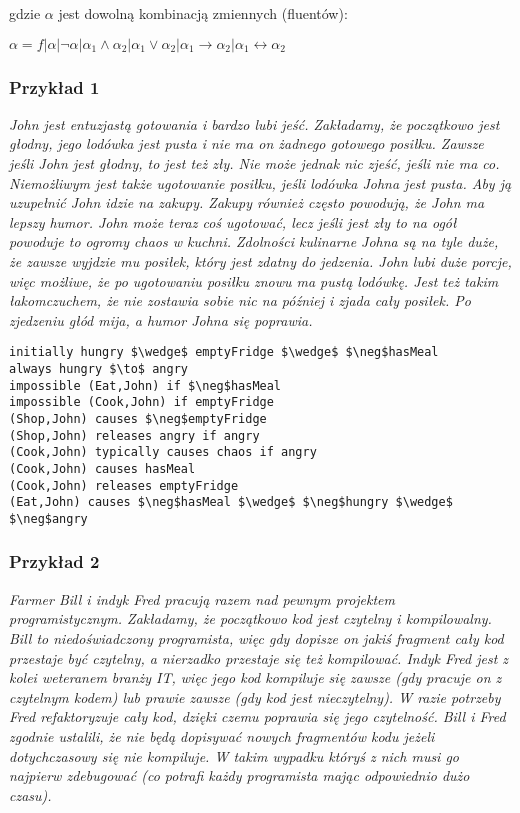 \documentclass{article}
\begin{document}
gdzie $\alpha$ jest dowolną kombinacją zmiennych (fluentów): 
\begin{center}
$\alpha= f | \alpha | \neg\alpha | \alpha_{1} \land \alpha_{2} | \alpha_{1} \lor \alpha_{2} | \alpha_{1} \to \alpha_{2} | \alpha_{1} \leftrightarrow \alpha_{2} $
\end{center}

\subsubsection{Przykład 1}


\textit{John jest entuzjastą gotowania i bardzo lubi jeść. Zakładamy, że początkowo jest głodny, jego lodówka jest pusta i nie ma on żadnego gotowego posiłku. Zawsze jeśli John jest głodny, to jest też zły. Nie może jednak nic zjeść, jeśli nie ma co. Niemożliwym jest także ugotowanie posiłku, jeśli lodówka Johna jest pusta. Aby ją uzupełnić John idzie na zakupy. Zakupy również często powodują, że John ma lepszy humor. John może teraz coś ugotować, lecz jeśli jest zły to na ogół powoduje to ogromy chaos w kuchni. Zdolności kulinarne Johna są na tyle duże, że zawsze wyjdzie mu posiłek, który jest zdatny do jedzenia. John lubi duże porcje, więc możliwe, że po ugotowaniu posiłku znowu ma pustą lodówkę. Jest też takim łakomczuchem, że nie zostawia sobie nic na później i zjada cały posiłek. Po zjedzeniu głód mija, a humor Johna się poprawia.}

\bigskip
{}
\begin{lstlisting}[mathescape=true]
initially hungry $\wedge$ emptyFridge $\wedge$ $\neg$hasMeal
always hungry $\to$ angry
impossible (Eat,John) if $\neg$hasMeal 
impossible (Cook,John) if emptyFridge
(Shop,John) causes $\neg$emptyFridge
(Shop,John) releases angry if angry
(Cook,John) typically causes chaos if angry
(Cook,John) causes hasMeal 
(Cook,John) releases emptyFridge 
(Eat,John) causes $\neg$hasMeal $\wedge$ $\neg$hungry $\wedge$ $\neg$angry
\end{lstlisting}

\subsubsection{Przykład 2}


\textit{Farmer Bill i indyk Fred pracują razem nad pewnym projektem programistycznym. Zakładamy, że początkowo kod jest czytelny i kompilowalny. Bill to niedoświadczony programista, więc gdy dopisze on jakiś fragment cały kod przestaje być czytelny, a nierzadko przestaje się też kompilować. Indyk Fred jest z kolei weteranem branży IT, więc jego kod kompiluje się zawsze (gdy pracuje on z czytelnym kodem) lub prawie zawsze (gdy kod jest nieczytelny). W razie potrzeby Fred refaktoryzuje cały kod, dzięki czemu poprawia się jego czytelność. Bill i Fred zgodnie ustalili, że nie będą dopisywać nowych fragmentów kodu jeżeli dotychczasowy się nie kompiluje. W takim wypadku któryś z nich musi go najpierw zdebugować (co potrafi każdy programista mając odpowiednio dużo czasu).}
\end{document}
